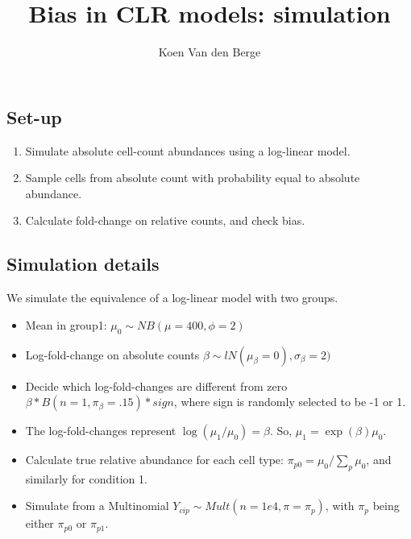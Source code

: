 \documentclass[
  letterpaper,
  DIV=11,
  numbers=noendperiod]{scrartcl}
\title{Bias in CLR models: simulation}
\author{Koen Van den Berge}
\date{}
\begin{document}
\maketitle
\ifdefined\Shaded\renewenvironment{Shaded}{\begin{tcolorbox}[sharp corners, frame hidden, interior hidden, borderline west={3pt}{0pt}{shadecolor}, boxrule=0pt, enhanced, breakable]}{\end{tcolorbox}}\fi

\hypertarget{set-up}{%
\subsection{Set-up}\label{set-up}}

\begin{enumerate}
\def\labelenumi{\arabic{enumi}.}
\item
  Simulate absolute cell-count abundances using a log-linear model.
\item
  Sample cells from absolute count with probability equal to absolute
  abundance.
\item
  Calculate fold-change on relative counts, and check bias.
\end{enumerate}

\hypertarget{simulation-details}{%
\subsection{Simulation details}\label{simulation-details}}

We simulate the equivalence of a log-linear model with two groups.

\begin{itemize}
\item
  Mean in group1: \(\mu_0 \sim NB(\mu=400, \phi=2)\)
\item
  Log-fold-change on absolute counts
  \(\beta \sim lN(\mu_{\beta}=0), \sigma_{\beta}=2)\)
\item
  Decide which log-fold-changes are different from zero
  \(\beta * B(n=1, \pi_{\beta} = .15) * sign\), where sign is randomly
  selected to be -1 or 1.
\item
  The log-fold-changes represent \(\log(\mu_1/\mu_0) = \beta\). So,
  \(\mu_1 = \exp(\beta) \mu_0\).
\item
  Calculate true relative abundance for each cell type:
  \(\pi_{p0} = \mu_0 / \sum_p \mu_0\), and similarly for condition 1.
\item
  Simulate from a Multinomial
  \(Y_{cip} \sim Mult(n= 1e4, \pi=\pi_{p})\), with \(\pi_p\) being
  either \(\pi_{p0}\) or \(\pi_{p1}\).
\end{itemize}
\end{document}
